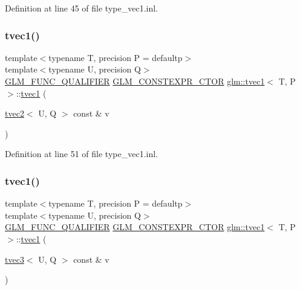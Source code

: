 Definition at line 45 of file type\+\_\+vec1.\+inl.

\mbox{\label{structglm_1_1tvec1_add32615332f25e7cc5abc5f34b57efc4}} 
\subsubsection{\texorpdfstring{tvec1()}{tvec1()}\hspace{0.1cm}{\footnotesize\ttfamily [12/14]}}
{\footnotesize\ttfamily template$<$typename T, precision P = defaultp$>$ \\
template$<$typename U, precision Q$>$ \\
\mbox{\hyperlink{setup_8hpp_a33fdea6f91c5f834105f7415e2a64407}{G\+L\+M\+\_\+\+F\+U\+N\+C\+\_\+\+Q\+U\+A\+L\+I\+F\+I\+ER}} \mbox{\hyperlink{setup_8hpp_ad34178a09666081abdb573c14d1f4a5a}{G\+L\+M\+\_\+\+C\+O\+N\+S\+T\+E\+X\+P\+R\+\_\+\+C\+T\+OR}} \mbox{\hyperlink{structglm_1_1tvec1}{glm\+::tvec1}}$<$ T, P $>$\+::\mbox{\hyperlink{structglm_1_1tvec1}{tvec1}} (\begin{DoxyParamCaption}\item[{\mbox{\hyperlink{structglm_1_1tvec2}{tvec2}}$<$ U, Q $>$ const \&}]{v }\end{DoxyParamCaption})}



Definition at line 51 of file type\+\_\+vec1.\+inl.

\mbox{\label{structglm_1_1tvec1_a39a04679b7f07e1e629c77a6f86a969e}} 
\subsubsection{\texorpdfstring{tvec1()}{tvec1()}\hspace{0.1cm}{\footnotesize\ttfamily [13/14]}}
{\footnotesize\ttfamily template$<$typename T, precision P = defaultp$>$ \\
template$<$typename U, precision Q$>$ \\
\mbox{\hyperlink{setup_8hpp_a33fdea6f91c5f834105f7415e2a64407}{G\+L\+M\+\_\+\+F\+U\+N\+C\+\_\+\+Q\+U\+A\+L\+I\+F\+I\+ER}} \mbox{\hyperlink{setup_8hpp_ad34178a09666081abdb573c14d1f4a5a}{G\+L\+M\+\_\+\+C\+O\+N\+S\+T\+E\+X\+P\+R\+\_\+\+C\+T\+OR}} \mbox{\hyperlink{structglm_1_1tvec1}{glm\+::tvec1}}$<$ T, P $>$\+::\mbox{\hyperlink{structglm_1_1tvec1}{tvec1}} (\begin{DoxyParamCaption}\item[{\mbox{\hyperlink{structglm_1_1tvec3}{tvec3}}$<$ U, Q $>$ const \&}]{v }\end{DoxyParamCaption})}



